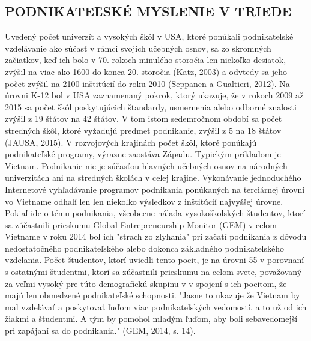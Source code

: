 \documentclass[10pt,oneside,slovak,a4paper]{article}
\begin{document}
\subsection{PODNIKATEĽSKÉ MYSLENIE V TRIEDE }
Uvedený počet univerzít a vysokých škôl v USA, ktoré ponúkali podnikateľské vzdelávanie ako súčasť 
v rámci svojich učebných osnov, sa zo skromných začiatkov, keď ich bolo v 70. rokoch minulého storočia len niekoľko desiatok, zvýšil na 
viac ako 1600 do konca 20. storočia (Katz, 2003) a odvtedy sa jeho počet zvýšil na 
2100 inštitúcií do roku 2010 (Seppanen a Gualtieri, 2012). Na úrovni K-12 bol v USA zaznamenaný pokrok, ktorý ukazuje, že v rokoch 2009 až 2015 sa počet škôl poskytujúcich štandardy, usmernenia alebo odborné znalosti zvýšil z 19 štátov na 42 štátov. V tom istom sedemročnom období sa počet 
stredných škôl, ktoré vyžadujú predmet podnikanie, zvýšil z 5 na 18 štátov (JAUSA, 2015).
V rozvojových krajinách počet škôl, ktoré ponúkajú podnikateľské programy, výrazne zaostáva 
Západu. Typickým príkladom je Vietnam. Podnikanie nie je súčasťou hlavných učebných osnov na národných univerzitách ani na stredných školách v celej krajine. Vykonávanie jednoduchého 
Internetové vyhľadávanie programov podnikania ponúkaných na terciárnej úrovni vo Vietname odhalí len 
len niekoľko výsledkov z inštitúcií najvyššej úrovne. Pokiaľ ide o tému podnikania, všeobecne 
nálada vysokoškolských študentov, ktorí sa zúčastnili prieskumu Global Entrepreneurship Monitor (GEM) 
v celom Vietname v roku 2014 bol ich "strach zo zlyhania" pri začatí podnikania z dôvodu nedostatočného podnikateľského alebo dokonca základného podnikateľského vzdelania. Počet študentov, ktorí uviedli tento pocit, je na úrovni 55  v porovnaní s ostatnými študentmi, ktorí sa zúčastnili prieskumu na celom svete, považovaný za veľmi vysoký pre túto demografickú skupinu v 
v spojení s ich pocitom, že majú len obmedzené podnikateľské schopnosti. "Jasne to ukazuje 
že Vietnam by mal vzdelávať a poskytovať ľuďom viac podnikateľských vedomostí, a to už od ich 
žiakmi a študentmi. A tým by pomohol mladým ľuďom, aby boli sebavedomejší pri zapájaní sa do podnikania." (GEM, 2014, s. 14).\cite{McDonald-ECTS}
\end{document}

